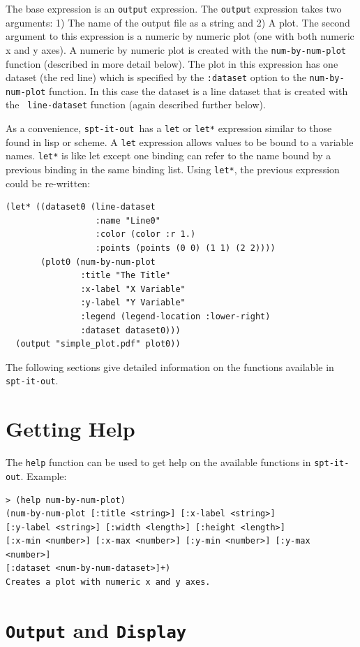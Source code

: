 \documentclass{article}
\newcommand{\sio}{{\tt spt-it-out}}
\begin{document}
The base expression is an {\tt output} expression.  The {\tt output}
expression takes two arguments: 1) The name of the output file as a
string and 2) A plot.  The second argument to this expression is a
numeric by numeric plot (one with both numeric x and y axes).  A
numeric by numeric plot is created with the {\tt num-by-num-plot}
function (described in more detail below).  The plot in this
expression has one dataset (the red line) which is specified by the
{\tt :dataset} option to the {\tt num-by-num-plot} function.  In this
case the dataset is a line dataset that is created with the {\tt
  line-dataset} function (again described further below).

As a convenience, \sio\ has a {\tt let} or {\tt let*} expression
similar to those found in lisp or scheme.  A {\tt let} expression
allows values to be bound to a variable names.  {\tt let*} is like let
except one binding can refer to the name bound by a previous binding
in the same binding list.  Using {\tt let*}, the previous expression
could be re-written:

\begin{verbatim}
(let* ((dataset0 (line-dataset
                  :name "Line0"
                  :color (color :r 1.)
                  :points (points (0 0) (1 1) (2 2))))
       (plot0 (num-by-num-plot
               :title "The Title"
               :x-label "X Variable"
               :y-label "Y Variable"
               :legend (legend-location :lower-right)
               :dataset dataset0)))
  (output "simple_plot.pdf" plot0))
\end{verbatim}

The following sections give detailed information on the functions
available in \sio.

\section{Getting Help}

The {\tt help} function can be used to get help on the available
functions in \sio.  Example:
\begin{verbatim}
> (help num-by-num-plot)
(num-by-num-plot [:title <string>] [:x-label <string>]
[:y-label <string>] [:width <length>] [:height <length>]
[:x-min <number>] [:x-max <number>] [:y-min <number>] [:y-max <number>]
[:dataset <num-by-num-dataset>]+)
Creates a plot with numeric x and y axes.
\end{verbatim}

\section{{\tt Output} and {\tt Display}}
\end{document}
